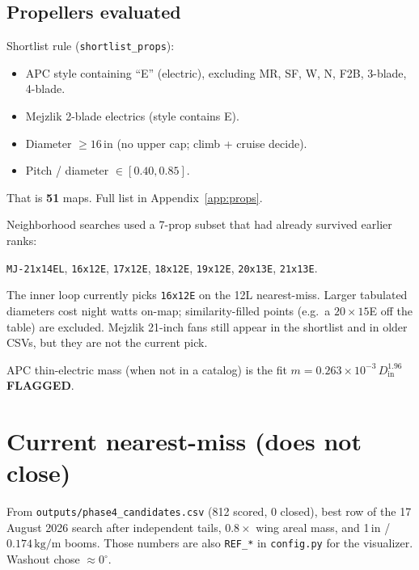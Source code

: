 \documentclass[11pt,letterpaper]{article}
\newcommand{\flag}{\textcolor{red!60!black}{\textbf{FLAGGED}}}
\newcommand{\code}[1]{\texttt{#1}}
\begin{document}
\subsection{Propellers evaluated}
\label{sec:props}

Shortlist rule (\code{shortlist\_props}):

\begin{itemize}
  \item APC style containing ``E'' (electric), excluding MR, SF, W, N, F2B, 3-blade, 4-blade.
  \item Mejzlik 2-blade electrics (style contains E).
  \item Diameter $\ge 16\,\mathrm{in}$ (no upper cap; climb + cruise decide).
  \item Pitch / diameter $\in [0.40, 0.85]$.
\end{itemize}

That is \textbf{51} maps. Full list in Appendix~\ref{app:props}.

Neighborhood searches used a 7-prop subset that had already survived earlier ranks:

\begin{center}
\texttt{MJ-21x14EL}, \texttt{16x12E}, \texttt{17x12E}, \texttt{18x12E},
\texttt{19x12E}, \texttt{20x13E}, \texttt{21x13E}.
\end{center}

The inner loop currently picks \texttt{16x12E} on the 12L nearest-miss. Larger tabulated diameters cost night watts on-map; similarity-filled points (e.g.\ a $20\times15$E off the table) are excluded. Mejzlik 21-inch fans still appear in the shortlist and in older CSVs, but they are not the current pick.

APC thin-electric mass (when not in a catalog) is the fit $m = 0.263\times 10^{-3}\, D_\mathrm{in}^{1.96}$ \flag{}.

\section{Current nearest-miss (does not close)}

From \code{outputs/phase4\_candidates.csv} (812 scored, 0 closed), best row of the 17 August 2026 search after independent tails, $0.8\times$ wing areal mass, and 1\,in / $0.174\,\mathrm{kg/m}$ booms. Those numbers are also \code{REF\_*} in \code{config.py} for the visualizer. Washout chose $\approx 0^\circ$.
\end{document}
